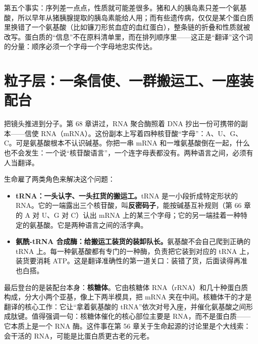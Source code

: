 第五个事实：序列差一点点，性质就可能差很多。猪和人的胰岛素只差一个氨基酸，所以早年从猪胰腺提取的胰岛素能给人用；而有些遗传病，仅仅是某个蛋白质里换错了一个氨基酸（比如镰刀形贫血症的血红蛋白），整条链的折叠和性质就被改写。蛋白质的“信息”不在原料清单里，而在排列顺序里——这正是“翻译”这个词的分量：顺序必须一个字母一个字母地忠实传达。

\section{粒子层：一条信使、一群搬运工、一座装配台}

把镜头推进到分子。第 68 章讲过，RNA 聚合酶照着 DNA 抄出一份可携带的副本——信使 RNA（mRNA）。这份副本上写着四种核苷酸“字母”：A、U、G、C。可是氨基酸根本不认识碱基。你把一串 mRNA 和一堆氨基酸倒在一起，什么也不会发生：一个说“核苷酸语言”，一个连字母表都没有。两种语言之间，必须有人当翻译。

生命雇了两类角色来解决这个问题：

\begin{itemize}[itemsep=2pt]
\item \textbf{tRNA：一头认字、一头扛货的搬运工。}tRNA 是一小段折成特定形状的 RNA。它的一端露出三个核苷酸，叫\textbf{反密码子}，能按碱基互补规则（第 66 章的 A 对 U、G 对 C）认出 mRNA 上的某三个字母；它的另一端挂着一种特定的氨基酸。它是两种语言之间的活字典。
\item \textbf{氨酰-tRNA 合成酶：给搬运工装货的装卸队长。}氨基酸不会自己爬到正确的 tRNA 上。每一种氨基酸都有专门的一种酶，负责把它装到对应的 tRNA 上，装货要消耗 ATP。这是翻译准确性的第一道关口：装错了货，后面读得再准也白搭。
\end{itemize}

最后登台的是装配台本身：\textbf{核糖体}。它由核糖体 RNA（rRNA）和几十种蛋白质构成，分大小两个亚基，像上下两半模具，把 mRNA 夹在中间。核糖体干的才是翻译的核心工作：它让“拿着氨基酸的 tRNA”依次对号入座，并催化氨基酸之间形成肽键。值得强调一句：核糖体催化的核心部位主要是 RNA，而不是蛋白质——它本质上是一个 RNA 酶。这件事在第 56 章关于生命起源的讨论里是个大线索：会干活的 RNA，可能是比蛋白质更古老的元老。

\begin{center}
\end{center}

